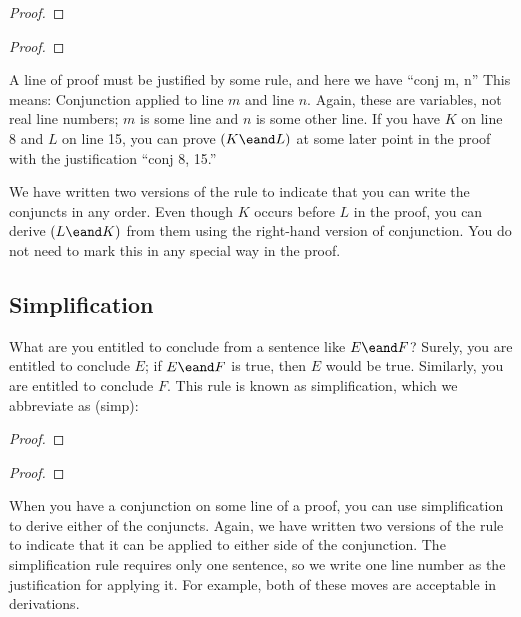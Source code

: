 \begin{multicols}{2}

\begin{proof}
	 
\end{proof}

\begin{proof}
	 
\end{proof}

\end{multicols}

A line of proof must be justified by some rule, and here we have ``conj m, n'' This means: Conjunction applied to line $m$ and line $n$. Again, these are variables, not real line numbers; $m$ is some line and $n$ is some other line. If you have $K$ on line 8 and $L$ on line 15, you can prove $(K\eand L)$ at some later point in the proof with the justification ``conj 8, 15.'' 

We have written two versions of the rule to indicate that you can write the conjuncts in any order. Even though $K$ occurs before $L$ in the proof, you can derive $(L \eand K)$ from them using the right-hand version of conjunction. You do not need to mark this in any special way in the proof.

\subsection{Simplification}

What are you entitled to conclude from a sentence like $E \eand F$? Surely, you are entitled to conclude $E$; if $E \eand F$ is true, then $E$ would be true. Similarly, you are entitled to conclude $F$. This rule is known as simplification, which we abbreviate as (simp):

\begin{multicols}{2}
\begin{proof}
	 
\end{proof}

\begin{proof}
	 
\end{proof}
\end{multicols}

When you have a conjunction on some line of a proof, you can use simplification to derive either of the conjuncts. Again, we have written two versions of the rule to indicate that it can be applied to either side of the conjunction. The simplification rule requires only one sentence, so we write one line number as the justification for applying it. For example, both of these moves are acceptable in derivations. 

